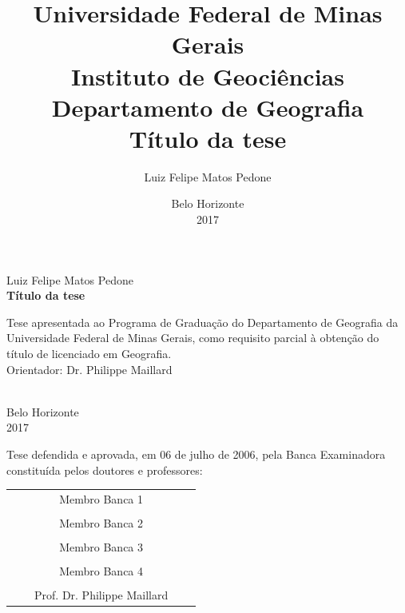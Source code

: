 \documentclass[
    oneside,
    a4paper,
    12pt
]{book}
\newcommand{\university}{Universidade Federal de Minas Gerais}
\newcommand{\institution}{Instituto de Geociências}
\newcommand{\department}{Departamento de Geografia}
\newcommand{\documentTitle}{Título da tese}
\newcommand{\documentAuthor}{Luiz Felipe Matos Pedone}
\newcommand{\documentAdvisor}{Dr. Philippe Maillard}
\newcommand{\documentYear}{2017}
\begin{document}
\onehalfspace
\frontmatter
\pagestyle{empty}
\title{
    \large
    {\university}\\
    {\institution}\\
    {\department}\\
    \vspace{2in}\huge\textbf{\documentTitle}\vspace{1.0in}
}
\author{\hspace{3in}\large \documentAuthor\vspace{0.7in}}
\date{Belo Horizonte\\{\documentYear}}

\maketitle
\begin{centering}
\large {\documentAuthor}\\
\vspace{2in}
\huge\textbf{\documentTitle}\\
\vspace{1in}
\normalsize
\raggedleft\parbox{8cm}{\raggedright{Tese apresentada ao Programa de Graduação do {\department} da {\university}, como requisito parcial à obtenção do título de licenciado em Geografia.\\
\vspace{0.5in}
Orientador: }{\documentAdvisor}}\\
\vspace{1in}
\centering \large Belo Horizonte\\{\documentYear}\\
\normalsize
\newpage
\raggedright{Tese defendida e aprovada, em 06 de julho de 2006, pela Banca Examinadora constituída pelos doutores e professores:}\\
\centering
\vspace{1.5in}

\begin{center}\begin{tabular}{c c c c c}
  \hline
   & & Membro  Banca 1 &  & \\
   \vspace{1 in}\\
  \hline
   & & Membro  Banca 2 &  & \\
   \vspace{1 in}\\
  \hline
   & & Membro  Banca 3 &  & \\
   \vspace{1 in}\\
  \hline
   & & Membro  Banca 4 &  & \\
   \vspace{1 in}\\
  \hline
   & & Prof. {\documentAdvisor} &  & \\

\end{tabular}\end{center}

\end{centering}
\end{document}
